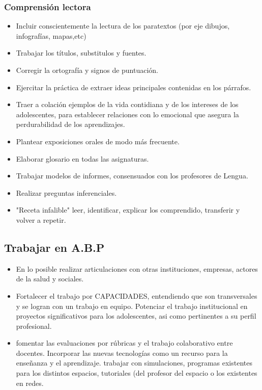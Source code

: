 \documentclass[../main]{subfiles}
\begin{document}
\subsubsection{Comprensión lectora}
\begin{itemize}
    \item Incluir conscientemente la lectura de los paratextos (por eje dibujos, infografías, mapas,etc)
    \item Trabajar los títulos, substitulos y fuentes.
    \item Corregir la ortografía y signos de puntuación.
    \item Ejercitar la práctica de extraer ideas principales contenidas en los párrafos.
    \item Traer a colación ejemplos de la vida contidiana y de los intereses de los adolescentes, para establecer relaciones con lo emocional que asegura la perdurabilidad de los aprendizajes.
    \item Plantear exposiciones orales de modo más frecuente.
    \item Elaborar glosario en todas las asignaturas.
    \item Trabajar modelos de informes, consensuados con los profesores de Lengua.
    \item Realizar preguntas inferenciales.
    \item "Receta infalible" leer, identificar, explicar los comprendido, transferir y volver a repetir.
\end{itemize}
\subsection{Trabajar en A.B.P}
\begin{itemize}
   \item En lo posible realizar articulaciones con otras instituciones, empresas, actores de la salud y sociales.
 \item Fortalecer el trabajo por CAPACIDADES, entendiendo que son transversales y se logran con un trabajo en equipo. Potenciar el trabajo institucional en proyectos significativos para los adolescentes, asi como pertinentes a su perfil profesional.
 \item fomentar las evaluaciones por rúbricas y el trabajo colaborativo entre docentes. Incorporar las nuevas tecnologías como un recurso para la enseñanza y el aprendizaje. trabajar con simulaciones, programas existentes para los distintos espacios, tutoriales (del profesor del espacio o los existentes en redes.
\end{itemize}
\end{document}
